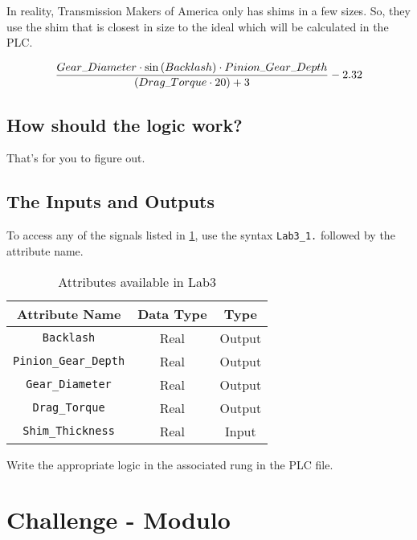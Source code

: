 
In reality, Transmission Makers of America only has shims in a few sizes. So, they use the shim that is closest in size to the ideal which will be calculated in the PLC. 

\begin{align}
\label{equ:Shim}
\tiny
\frac{Gear\_Diameter \cdot \sin{(Backlash)} \cdot Pinion\_Gear\_Depth}{(Drag\_Torque \cdot 20) + 3} - 2.32
\end{align}


\subsection{How should the logic work?}

That's for you to figure out.

\subsection{The Inputs and Outputs}

To access any of the signals listed in \tableautorefname \ref{Table:Lab3_1Attributes}, use the syntax \verb|Lab3_1.| followed by the attribute name. 

\begin{table}[h]
\centering
\caption{Attributes available in Lab3}
\label{Table:Lab3_1Attributes}
\begin{tabular}{c c c}
\toprule
Attribute Name & Data Type & Type\\
\midrule
\verb|Backlash| & Real & Output \\
\verb|Pinion_Gear_Depth| &  Real & Output \\
\verb|Gear_Diameter| &  Real & Output \\
\verb|Drag_Torque| &  Real & Output \\
\midrule
\verb|Shim_Thickness| & Real & Input\\
\bottomrule
\end{tabular}
\end{table}

Write the appropriate logic in the associated rung in the PLC file.

\TASignatureSlot



\section{Challenge - Modulo}

